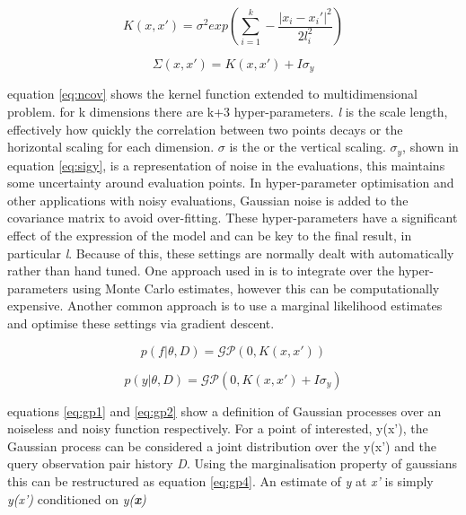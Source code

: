 \documentclass{article}
\begin{document}
			\begin{equation} \label{eq:ncov} K(x,x') = \sigma^2 exp\left(\sum_{i=1}^k-\frac{\mathopen|x_i - x_i'\mathclose|^2}{2l_i^2}\right)\end{equation}

			\begin{equation}\label{eq:sigy} \Sigma(x,x') = K(x,x') + I \sigma_y \end{equation}


			 equation \ref{eq:ncov} shows the kernel function extended to multidimensional problem. for k dimensions there are k+3 hyper-parameters. \textit{l} is the scale length, effectively how quickly the correlation between two points decays or the horizontal scaling for each dimension. \(\sigma\) is the or the vertical scaling. \(\sigma_y\), shown in equation \ref{eq:sigy}, is a representation of noise in the evaluations, this maintains some uncertainty around evaluation points.  In hyper-parameter optimisation and other applications with noisy evaluations, Gaussian noise is added to the covariance matrix to avoid over-fitting. These hyper-parameters have a significant effect of the expression of the model and can be key to the final result, in particular \textit{l}. Because of this, these settings are normally dealt with automatically rather than hand tuned. One approach used in \cite{17} is to integrate over the hyper-parameters using Monte Carlo estimates, however this can be computationally expensive. Another common approach is to use a marginal likelihood estimates and optimise these settings via gradient descent.

 


			\begin{equation}\label{eq:gp1} p(f|\theta,D) = \mathcal{GP}(0,K(x,x'))\end{equation}

			\begin{equation}\label{eq:gp2} p(y|\theta,D) = \mathcal{GP}(0,K(x,x') + I\sigma_y)\end{equation}


 			equations \ref{eq:gp1} and \ref{eq:gp2} show a definition of Gaussian processes over an noiseless and noisy function respectively. For a point of interested, y(x'), the Gaussian process can be considered a joint distribution over the y(x') and the query observation pair history \textit{D}. Using the marginalisation property of gaussians this can be restructured as equation \ref{eq:gp4}. An estimate of \textit{y} at \textit{x'} is simply \textit{y(x')} conditioned on \textit{y(\textbf{x})} 
\end{document}
